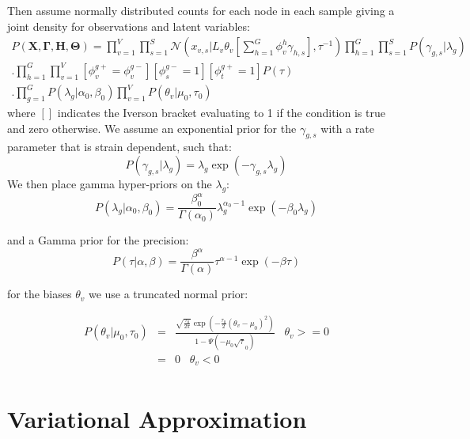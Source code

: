 \documentclass[10pt]{article}
\begin{document}
Then assume normally distributed counts for each node in each sample giving a joint density for observations and latent variables: 
\begin{multline}
P(\mathbf{X},\mathbf{\Gamma},\mathbf{H},\mathbf{\Theta})  = \prod_{v=1}^V \prod_{s=1}^S \mathcal{N}(x_{v,s}|L_v \theta_v [\sum_{h=1}^G \phi^h_v \gamma_{h,s}],\tau^{-1}) 
\prod_{h=1}^G \prod_{s=1}^S P(\gamma_{g,s} | \lambda_g) \\
.\prod_{h=1}^G \prod_{v=1}^V \left[ \phi^{g+}_v = \phi^{g-}_v \right]
 \left[ \phi^{g-}_s = 1\right]  \left[\phi^{g+}_t = 1\right] P(\tau) \\ .\prod_{g=1}^G P(\lambda_g | \alpha_0, \beta_0) 
 \prod_{v=1}^V P(\theta_v | \mu_0, \tau_0)
\end{multline}
where $\left[\right]$ indicates the Iverson bracket evaluating to 1 if the condition is true and zero otherwise. We assume an exponential prior for the $\gamma_{g,s}$ with a rate parameter that is strain dependent, 
such that:
\begin{equation}
P(\gamma_{g,s}| \lambda_g) = \lambda_g \exp(-\gamma_{g,s} \lambda_g)
\end{equation}
We then place gamma hyper-priors on the $\lambda_g$:
\begin{equation}
P(\lambda_{g}| \alpha_0, \beta_0) =  \frac{\beta_0^\alpha}{\Gamma (\alpha_0)} \lambda_g^{\alpha_0 - 1} \exp(- \beta_0 \lambda_g)
\end{equation}

\noindent and a Gamma prior for the precision:
\begin{equation}
P(\tau | \alpha, \beta) = \frac{\beta^\alpha}{\Gamma(\alpha)} \tau^{\alpha - 1} \exp(-\beta \tau)
\end{equation}

\noindent for the biases $\theta_v$ we use a truncated normal prior:

\begin{align*}
P(\theta_v | \mu_0, \tau_0) & = & \frac{\sqrt{\frac{\tau_0}{2 \pi}}  \exp(- \frac{\tau_0}{2} (\theta_v - \mu_0)^2)  }{1 - \Psi(-\mu_0 \sqrt \tau_0 )}  \;\;\; \theta_v >= 0 \\
                            & = & 0 \;\;\; \theta_v < 0 \\
\end{align*}

%

\section{Variational Approximation}
\end{document}
